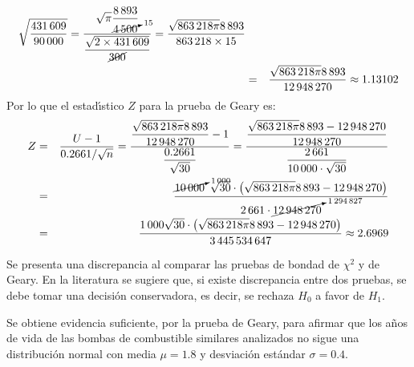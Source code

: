 \begin{solucion}
\begin{estadistico}
\begin{eqnarray*}
{   \displaystyle{\sqrt{ \frac{431\,609}{90\,000} }}}
   = \frac{\displaystyle{\sqrt{\pi} \frac{8\,893}{\cancelto{15}{4\,500}}}}{
   \displaystyle{
   \frac{\sqrt{2\times 431\,609}}{\cancel{300}} 
   }}
   = \frac{\sqrt{863\,218\pi} 8\,893}{863\,218 \times 15} \\
   & = & \frac{\sqrt{863\,218\pi} 8\,893}{12\,948\,270}
   \approx 1.13102
  \end{eqnarray*}
  Por lo que el estad\'{\i}stico $Z$ para la prueba de Geary es:
  \begin{eqnarray*}
   Z & = & \frac{U - 1}{0.2661/\sqrt{n}} = 
   \frac{\displaystyle{\frac{\sqrt{863\,218\pi} 8\,893}{12\,948\,270} - 1}
   }{\displaystyle{\frac{0.2661}{\sqrt{30}}}}
   = \frac{\displaystyle{
   \frac{\sqrt{863\,218\pi} 8\,893 - 12\,948\,270}{12\,948\,270}}}{
   \displaystyle{\frac{2\,661}{10\,000\cdot \sqrt{30}}}} \\
   & = & \frac{\cancelto{1\,000}{10\,000}\,\,\,\sqrt{30} \cdot
   \left(\sqrt{863\,218\pi} 8\,893 - 12\,948\,270\right)}{
   2\,661\cdot \cancelto{1\,294\,827}{12\,948\,270}} \\
   & = & \frac{1\,000\sqrt{30} \cdot
   \left(\sqrt{863\,218\pi} 8\,893 - 12\,948\,270\right)}{
   3\,445\,534\,647} \approx 2.6969 \\
  \end{eqnarray*}
 \end{estadistico}

 \begin{decision}
  Se presenta una discrepancia al comparar las pruebas de bondad de $\chi^2$
  y de Geary.
  En la literatura se sugiere que, si existe discrepancia entre dos pruebas,
  se debe tomar una decisi\'on conservadora, es decir,
  se rechaza $H_0$ a favor de $H_1$.
 \end{decision}

 \begin{conclusion}
  Se obtiene evidencia suficiente, por la prueba de Geary, para afirmar
  que los a\~nos de vida de las bombas de combustible similares analizados
  no sigue una distribuci\'on normal con media $\mu = 1.8$
  y desviaci\'on est\'andar $\sigma = 0.4$.
 \end{conclusion}


\end{solucion}
